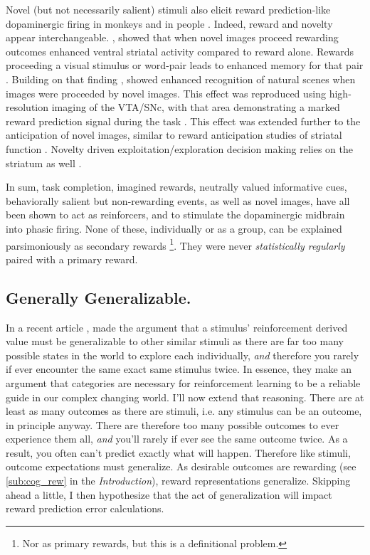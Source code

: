 \documentclass[doc,12pt]{apa}        %
\begin{document}
Novel (but not necessarily salient) stimuli also elicit reward prediction-like dopaminergic firing in monkeys \cite{Blatter:2006p6372} and in people \cite{Bunzeck:2006p5319}. Indeed, reward and novelty appear interchangeable.  , showed that when novel images proceed rewarding outcomes enhanced ventral striatal activity compared to reward alone.  Rewards proceeding a visual stimulus or word-pair leads to enhanced memory for that pair \cite{Lisman:2005p5455}.  Building on that finding , showed enhanced recognition of natural scenes when images were proceeded by novel images.  This effect was reproduced using high-resolution imaging of the VTA/SNc, with that area demonstrating a marked reward prediction signal during the task \cite{Krebs:2011p8134}.  This effect was extended further to the anticipation of novel images, similar to reward anticipation studies of striatal function \cite{Knutson:2001p5234}.  Novelty driven exploitation/exploration decision making relies on the striatum as well \cite{Wittmann:2008p541}.

In sum, task completion, imagined rewards, neutrally valued informative cues, behaviorally salient but non-rewarding events, as well as novel images, have all been shown to act as reinforcers, and to stimulate the dopaminergic midbrain into phasic firing.  None of these, individually or as a group, can be explained parsimoniously as secondary rewards
\footnote{
    Nor as primary rewards, but this is a definitional problem.
}.  They were never \emph{statistically regularly} paired with a primary reward.


\subsection{Generally Generalizable.}
\label{sub:gen}
In a recent article , made the argument that a stimulus' reinforcement derived value must be generalizable to other similar stimuli as there are far too many possible states in the world to explore each individually, \emph{and} therefore you rarely if ever encounter the same exact same stimulus twice.  In essence, they make an argument that categories are necessary for reinforcement learning to be a reliable guide in our complex changing world.  I'll now extend that reasoning.  There are at least as many outcomes as there are stimuli, i.e. any stimulus can be an outcome, in principle anyway. There are therefore too many possible outcomes to ever experience them all, \emph{and} you'll rarely if ever see the same outcome twice.  As a result, you often can't predict exactly what will happen. Therefore like stimuli, outcome expectations must generalize.  As desirable outcomes are rewarding (see \ref{sub:cog_rew} in the \emph{Introduction}), reward representations generalize.  Skipping ahead a little, I then hypothesize that the act of generalization will impact reward prediction error calculations.
\end{document}

